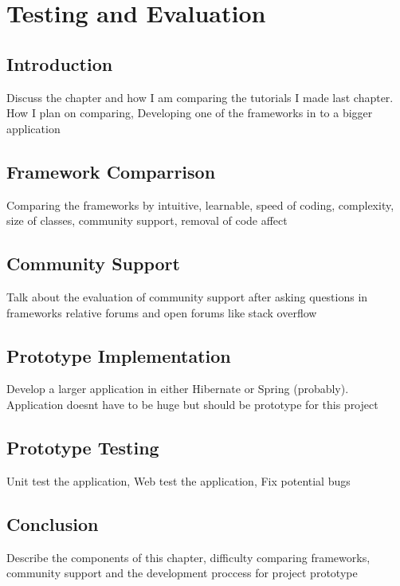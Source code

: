 \chapter*{Testing and Evaluation}
\section{Introduction}
Discuss the chapter and how I am comparing the tutorials I made last chapter.
How I plan on comparing, Developing one of the frameworks in to a bigger application
\section{Framework Comparrison}
Comparing the frameworks by intuitive, learnable, speed of coding, complexity,
size of classes, community support, removal of code affect
\section{Community Support}
Talk about the evaluation of community support after asking questions
in frameworks relative forums and open forums like stack overflow
\section{Prototype Implementation}
Develop a larger application in either Hibernate or Spring (probably).
Application doesnt have to be huge but should be prototype for this project
\section{Prototype Testing}
Unit test the application, Web test the application, Fix potential bugs
\section{Conclusion}
Describe the components of this chapter, difficulty comparing frameworks, community support
and the development proccess for project prototype
